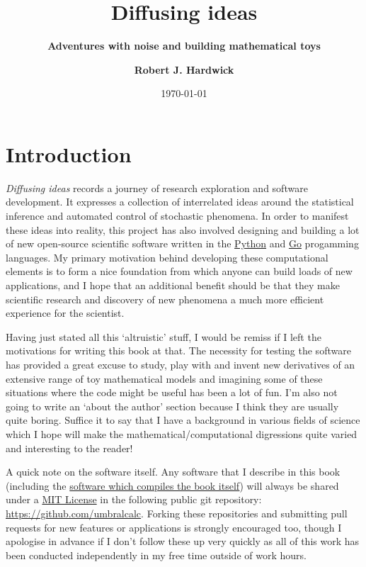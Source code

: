 \documentclass{book}
\title{\Huge \bfseries\sffamily Diffusing ideas}
\subtitle{\Large \bfseries\sffamily \color{gray75} Adventures with noise and building mathematical toys}
\author{\bfseries\sffamily Robert J. Hardwick}
\date{\today}
\begin{document}
\maketitle
\frontmatter

\chapter*{Introduction}

\emph{Diffusing ideas} records a journey of research exploration and software development. It expresses a collection of interrelated ideas around the statistical inference and automated control of stochastic phenomena. In order to manifest these ideas into reality, this project has also involved designing and building a lot of new open-source scientific software written in the \href{https://www.python.org/}{Python} and \href{https://go.dev/}{Go} progamming languages. My primary motivation behind developing these computational elements is to form a nice foundation from which anyone can build loads of new applications, and I hope that an additional benefit should be that they make scientific research and discovery of new phenomena a much more efficient experience for the scientist. 

Having just stated all this `altruistic' stuff, I would be remiss if I left the motivations for writing this book at that. The necessity for testing the software has provided a great excuse to study, play with and invent new derivatives of an extensive range of toy mathematical models and imagining some of these situations where the code might be useful has been a lot of fun. I'm also not going to write an `about the author' section because I think they are usually quite boring. Suffice it to say that I have a background in various fields of science which I hope will make the mathematical/computational digressions quite varied and interesting to the reader!

A quick note on the software itself. Any software that I describe in this book (including the \href{https://github.com/umbralcalc/diffusing-ideas}{software which compiles the book itself}) will always be shared under a \href{https://opensource.org/licenses/MIT}{MIT License} in the following public git repository: \href{https://github.com/umbralcalc}{https://github.com/umbralcalc}. Forking these repositories and submitting pull requests for new features or applications is strongly encouraged too, though I apologise in advance if I don't follow these up very quickly as all of this work has been conducted independently in my free time outside of work hours.
\end{document}
